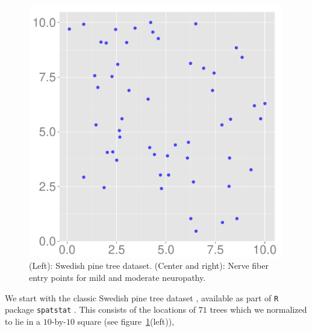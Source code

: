 \documentclass{statsoc}
\begin{document}
\begin{figure}
\begin{minipage}[h]{0.32\linewidth}
  \end{minipage}
  \begin{minipage}[h]{0.32\linewidth}
  \centering
  \includegraphics[width=0.99\textwidth]{figs/mod1.pdf}
  \end{minipage}
  \caption[Post Pred]{(Left): Swedish pine tree dataset. (Center and right): Nerve fiber entry points for mild and moderate neuropathy.}
  \label{fig:diab}
  \end{figure}
  We start with the classic Swedish pine tree dataset \citep{Ripley88},
available as part of \texttt{R} package \texttt{spatstat} \citep{spatstat}. 
This consists of the locations of $71$ trees which we normalized to lie in a $10$-by-$10$ square (see figure~\ref{fig:diab}(left)), 
\end{document}
